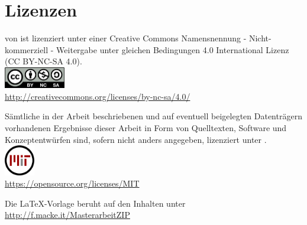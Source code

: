 \chapter*{Lizenzen}

\begin{center}

\vspace*{\fill}

\quotes{\thema} von \autor\space ist lizenziert unter einer Creative Commons Namensnennung - Nicht-kommerziell - Weitergabe unter gleichen Bedingungen 4.0 International Lizenz (CC BY-NC-SA 4.0). \\
\includegraphics[width=0.2\textwidth]{Bilder/by-nc-sa-eu}\\
\url{http://creativecommons.org/licenses/by-nc-sa/4.0/} \\\visitedOn

\vspace*{\fill}

Sämtliche in der Arbeit beschriebenen und auf eventuell beigelegten Datenträgern
vorhandenen Ergebnisse dieser Arbeit in Form von Quelltexten, Software und
Konzeptentwürfen sind, sofern nicht anders angegeben, lizenziert unter . \\
\includegraphics[width=0.1\textwidth]{Bilder/mit_license}\\
\url{https://opensource.org/licenses/MIT} \\\visitedOn

\vspace*{\fill}

Die LaTeX-Vorlage beruht auf den Inhalten unter\\
\url{http://f.macke.it/MasterarbeitZIP} \\\visitedOn

\vspace*{\fill}

\end{center}

